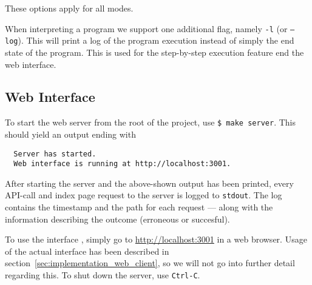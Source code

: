 These options apply for all modes.

When interpreting a program we support one additional flag, namely \texttt{-l} (or \texttt{--log}). This will print a log of the program execution instead of simply the end state of the program. This is used for the step-by-step execution feature end the web interface.

\subsection{Web Interface}

To start the web server from the root of the project, use \texttt{\$ make server}. This should yield an output ending with
\begin{verbatim}
  Server has started.
  Web interface is running at http://localhost:3001.
\end{verbatim}
After starting the server and the above-shown output has been printed, every API-call and index page request to the server is logged to \texttt{stdout}.
The log contains the timestamp and the path for each request --- along with the information describing the outcome (erroneous or succesful).


To use the interface , simply go to \url{http://localhost:3001} in a web browser. Usage of the actual interface has been described in section~\ref{sec:implementation_web_client}, so we will not go into further detail regarding this. To shut down the server, use \texttt{Ctrl-C}.
